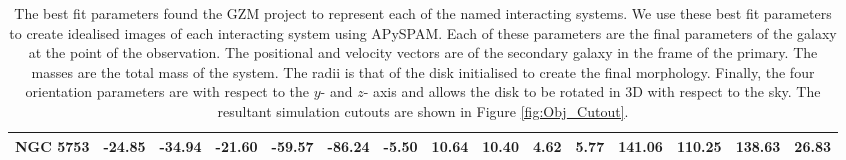 \begin{table}
{\begin{tabular}{|c|c|c|c|c|c|c|c|c|c|c|c|c|c|c|}
     NGC 5753 &   -24.85 &   -34.94 &   -21.60 &               -59.57 &               -86.24 &                -5.50 &                          10.64 &                          10.40 &          4.62 &          5.77 &      141.06 &      110.25 &        138.63 &         26.83 \\
\hline
\end{tabular}}
    \caption{The best fit parameters found the GZM project to represent each of the named interacting systems. We use these best fit parameters to create idealised images of each interacting system using APySPAM. Each of these parameters are the final parameters of the galaxy at the point of the observation. The positional and velocity vectors are of the secondary galaxy in the frame of the primary. The masses are the total mass of the system. The radii is that of the disk initialised to create the final morphology. Finally, the four orientation parameters are with respect to the $y$- and $z$- axis and allows the disk to be rotated in 3D with respect to the sky. The resultant simulation cutouts are shown in Figure \ref{fig:Obj_Cutout}.}
    \label{tab:Objects}
\end{table}

